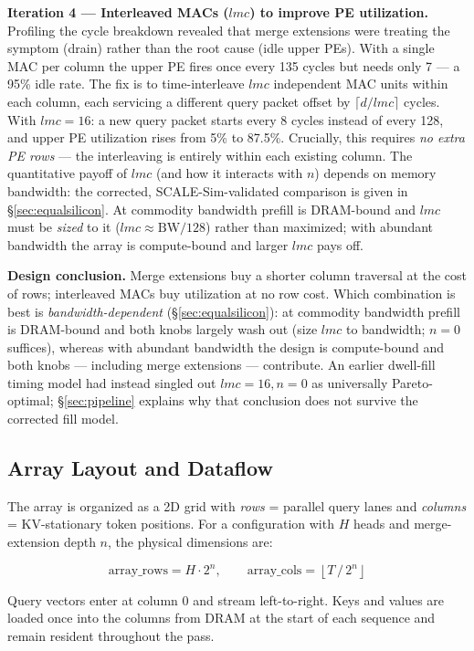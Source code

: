 \documentclass[11pt]{article}
\begin{document}
\textbf{Iteration 4 --- Interleaved MACs (\(lmc\)) to improve PE utilization.}
Profiling the cycle breakdown revealed that merge extensions
were treating the symptom (drain) rather than the root cause
(idle upper PEs).
With a single MAC per column the upper PE fires once every
135 cycles but needs only 7 --- a 95\% idle rate.
The fix is to time-interleave \(lmc\) independent MAC units
within each column, each servicing a different query packet
offset by \(\lceil d / lmc \rceil\) cycles.
With \(lmc = 16\): a new query packet starts every 8 cycles
instead of every 128, and upper PE utilization rises from
5\% to 87.5\%.
Crucially, this requires \textit{no extra PE rows} ---
the interleaving is entirely within each existing column.
The quantitative payoff of \(lmc\) (and how it interacts with \(n\))
depends on memory bandwidth: the corrected, SCALE-Sim-validated
comparison is given in \S\ref{sec:equalsilicon}. At commodity
bandwidth prefill is DRAM-bound and \(lmc\) must be \emph{sized} to it
(\(lmc \approx \text{BW}/128\)) rather than maximized; with abundant
bandwidth the array is compute-bound and larger \(lmc\) pays off.

\textbf{Design conclusion.}
Merge extensions buy a shorter column traversal at the cost of rows;
interleaved MACs buy utilization at no row cost. Which combination is
best is \emph{bandwidth-dependent} (\S\ref{sec:equalsilicon}): at
commodity bandwidth prefill is DRAM-bound and both knobs largely wash
out (size \(lmc\) to bandwidth; \(n = 0\) suffices), whereas with
abundant bandwidth the design is compute-bound and both knobs ---
including merge extensions --- contribute. An earlier dwell-fill timing
model had instead singled out \(lmc = 16, n = 0\) as universally
Pareto-optimal; \S\ref{sec:pipeline} explains why that conclusion does
not survive the corrected fill model.

\subsection{Array Layout and Dataflow}

The array is organized as a 2D grid with
\textit{rows} = parallel query lanes and
\textit{columns} = KV-stationary token positions.
For a configuration with \(H\) heads and merge-extension
depth \(n\), the physical dimensions are:

\[
\text{array\_rows} = H \cdot 2^n, \qquad
\text{array\_cols} = \left\lfloor T \,/\, 2^n \right\rfloor
\]

Query vectors enter at column 0 and stream left-to-right.
Keys and values are loaded once into the columns from DRAM
at the start of each sequence and remain resident throughout
the pass.
\end{document}
